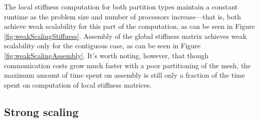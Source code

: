 \documentclass{article}
\begin{document}
The local stiffness computation for both partition types maintain a constant runtime as the problem size and number of processors increase---that is, both achieve weak scalability for this part of the computation, as can be seen in Figure \ref{fig:weakScalingStiffness}.  Assembly of the global stiffness matrix achieves weak scalability only for the contiguous case, as can be seen in Figure \ref{fig:weakScalingAssembly}. It's worth noting, however, that though communication costs grow much faster with a poor partitioning of the mesh, the maximum amount of time spent on assembly is still only a fraction of the time spent on computation of local stiffness matrices.  

\subsection{Strong scaling}
\end{document}
